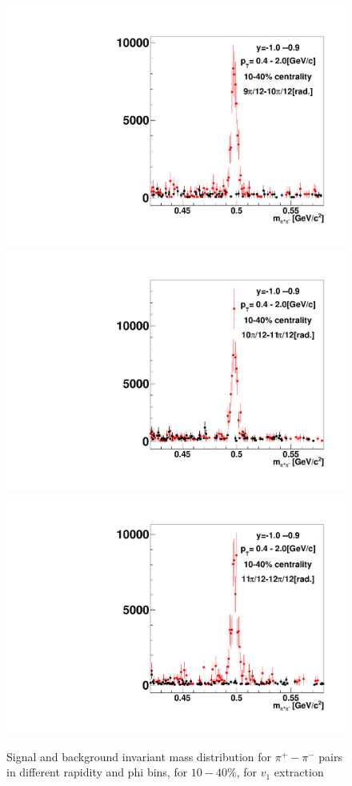 \begin{figure}[h]
\includegraphics[width=0.14\linewidth]{chapterX/fig/ks_v1_sig/kf_ptslice0_cent1_ks_flow_phi10_rap14_check.pdf}
\includegraphics[width=0.14\linewidth]{chapterX/fig/ks_v1_sig/kf_ptslice0_cent1_ks_flow_phi11_rap14_check.pdf}
\includegraphics[width=0.14\linewidth]{chapterX/fig/ks_v1_sig/kf_ptslice0_cent1_ks_flow_phi12_rap14_check.pdf}

\caption{Signal and background invariant mass distribution for $\pi^{+}-\pi^{-}$ pairs in different rapidity and phi bins, for $10-40\%$, for $v_{1}$ extraction}
\label{ks_v1_sig_raw3}
\end{figure}


